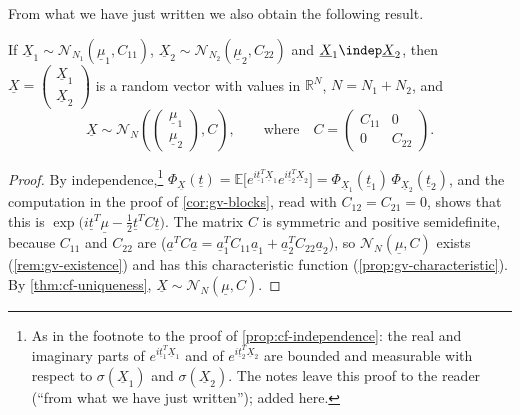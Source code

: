 From what we have just written we also obtain the following result.

\begin{proposition}\label{prop:gv-concatenation}
If $\underline X_1\sim\mathcal N_{N_1}(\underline\mu_1,C_{11})$,
$\underline X_2\sim\mathcal N_{N_2}(\underline\mu_2,C_{22})$ and
$\underline X_1\indep\underline X_2$, then
$\underline X=\left(\begin{smallmatrix}\underline X_1\\\underline X_2\end{smallmatrix}\right)$ is a
random vector with values in $\mathbb R^N$, $N=N_1+N_2$, and
\[
  \underline X\sim\mathcal N_N\left(\begin{pmatrix}\underline\mu_1\\\underline\mu_2\end{pmatrix},C\right),
  \qquad\text{where}\quad C=\begin{pmatrix}C_{11}&0\\0&C_{22}\end{pmatrix}.
\]
\end{proposition}

\begin{proof}
By independence,\footnote{As in the footnote to the proof of \cref{prop:cf-independence}: the
real and imaginary parts of $e^{i\underline t_1^T\underline X_1}$ and of
$e^{i\underline t_2^T\underline X_2}$ are bounded and measurable with respect to
$\sigma(\underline X_1)$ and $\sigma(\underline X_2)$. The notes leave this proof to the reader
(``from what we have just written''); added here.}
$\Phi_{\underline X}(\underline t)=\mathbb E\big[e^{i\underline t_1^T\underline X_1}e^{i\underline t_2^T\underline X_2}\big]
=\Phi_{\underline X_1}(\underline t_1)\,\Phi_{\underline X_2}(\underline t_2)$, and the computation in
the proof of \cref{cor:gv-blocks}, read with $C_{12}=C_{21}=0$, shows that this is
$\exp\big(i\underline t^T\underline\mu-\frac12\underline t^TC\underline t\big)$. The matrix $C$ is
symmetric and positive semidefinite, because $C_{11}$ and $C_{22}$ are
($\underline a^TC\underline a=\underline a_1^TC_{11}\underline a_1+\underline a_2^TC_{22}\underline a_2$),
so $\mathcal N_N(\underline\mu,C)$ exists (\cref{rem:gv-existence}) and has this characteristic
function (\cref{prop:gv-characteristic}). By \cref{thm:cf-uniqueness},
$\underline X\sim\mathcal N_N(\underline\mu,C)$.
\end{proof}

